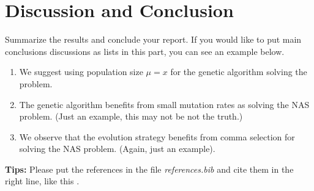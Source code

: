 \documentclass{article}
\begin{document}
\section{Discussion and Conclusion}\label{sec:dis&res}

Summarize the results and conclude your report. If you would like to put main conclusions  discussions as lists in this part, you can see an example below.

\begin{enumerate}[1)]
    \item We suggest using population size $\mu=x$ for the genetic algorithm solving the problem.
    
    \item The genetic algorithm benefits from small mutation rates as solving the \textsc{NAS} problem. (Just an example, this may not be not the truth.)
    
    \item We observe that the evolution strategy benefits from comma selection for solving the \textsc{NAS} problem. (Again, just an example).
\end{enumerate}
 
 \textbf{Tips:} Please put the references in the file \emph{references.bib} and cite them in the right line, like this \cite{hadash2018estimate}.

  
  
\end{document}
